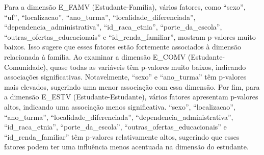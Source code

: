 Para a dimensão E\_FAMV (Estudante-Família), vários fatores, como ``sexo'', ``uf'', ``localizacao'', ``ano\_turma'', ``localidade\_diferenciada'', ``dependencia\_administrativa'', ``id\_raca\_etnia'', ``porte\_da\_escola'', ``outras\_ofertas\_educacionais'' e ``id\_renda\_familiar'', mostram p-valores muito baixos. Isso sugere que esses fatores estão fortemente associados à dimensão relacionada à família. Ao examinar a dimensão E\_COMV (Estudante-Comunidade), quase todas as variáveis têm p-valores muito baixos, indicando associações significativas. Notavelmente, ``sexo'' e ``ano\_turma'' têm p-valores mais elevados, sugerindo uma menor associação com essa dimensão. Por fim, para a dimensão E\_ESTV (Estudante-Estudante), vários fatores apresentam p-valores altos, indicando uma associação menos significativa. ``sexo'', ``localizacao'', ``ano\_turma'', ``localidade\_diferenciada'', ``dependencia\_administrativa'', ``id\_raca\_etnia'', ``porte\_da\_escola'', ``outras\_ofertas\_educacionais'' e ``id\_renda\_familiar'' têm p-valores relativamente altos, sugerindo que esses fatores podem ter uma influência menos acentuada na dimensão do estudante. 

